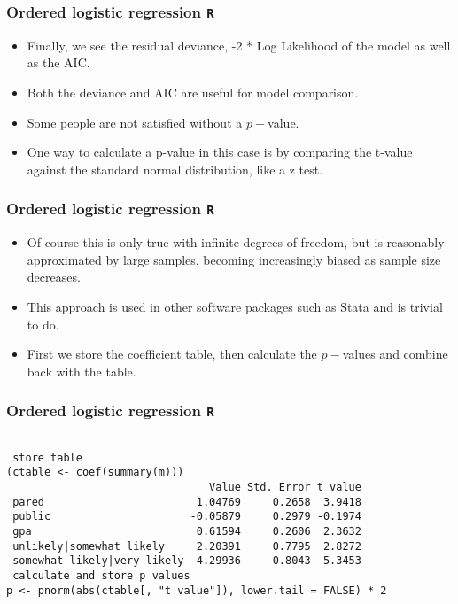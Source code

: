 \documentclass[00-GLMregslides.tex]{subfiles}
\begin{document}
\begin{frame}[fragile]
	\frametitle{Ordered logistic regression \texttt{R} }
	\Large
\begin{itemize}
\item Finally, we see the residual deviance, -2 * Log Likelihood of the model as well as the AIC. 
\item Both the deviance and AIC are useful for model comparison.
\item Some people are not satisfied without a $p-$value.
\item One way to calculate a p-value in this case is by comparing the t-value against the standard normal distribution, like a z test. 
\end{itemize}
\end{frame}
\begin{frame}[fragile]
	\frametitle{Ordered logistic regression \texttt{R} }
	\Large
\begin{itemize}
\item Of course this is only true with infinite degrees of freedom, but is reasonably approximated by large 
samples, becoming increasingly biased as sample size decreases. 
\item This approach is used in other software packages such as Stata and is trivial to do. 
\item First we store the coefficient table, then calculate the $p-$values and combine back with the table.
\end{itemize}
\end{frame}
\begin{frame}[fragile]
	\frametitle{Ordered logistic regression \texttt{R} }
	\large
\begin{framed}		
	\begin{verbatim}
		
 store table
(ctable <- coef(summary(m)))
                                Value Std. Error t value
 pared                        1.04769     0.2658  3.9418
 public                      -0.05879     0.2979 -0.1974
 gpa                          0.61594     0.2606  2.3632
 unlikely|somewhat likely     2.20391     0.7795  2.8272
 somewhat likely|very likely  4.29936     0.8043  5.3453
 calculate and store p values
p <- pnorm(abs(ctable[, "t value"]), lower.tail = FALSE) * 2
\end{verbatim}
\end{framed}
\end{frame}
\end{document}
